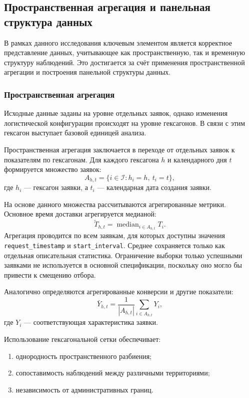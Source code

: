 \documentclass[14pt,a4paper]{extarticle}
\begin{document}
\subsection{Пространственная агрегация и панельная структура данных}

В рамках данного исследования ключевым элементом является корректное представление данных, учитывающее как пространственную, так и временную структуру наблюдений. Это достигается за счёт применения пространственной агрегации и построения панельной структуры данных.

\subsubsection{Пространственная агрегация}

Исходные данные заданы на уровне отдельных заявок, однако изменения логистической конфигурации происходят на уровне гексагонов. В связи с этим гексагон выступает базовой единицей анализа.

Пространственная агрегация заключается в переходе от отдельных заявок к показателям по гексагонам. Для каждого гексагона \(h\) и календарного дня \(t\) формируется множество заявок:
\[
A_{h,t} = \{ i \in \mathcal{I} : h_i = h,\ t_i = t \},
\]
где \(h_i\) --- гексагон заявки, а \(t_i\) --- календарная дата создания заявки.

На основе данного множества рассчитываются агрегированные метрики. Основное время доставки агрегируется медианой:
\[
\widetilde{T}_{h,t} =
\operatorname{median}_{i\in A_{h,t}} T_i.
\]
Агрегация проводится по всем заявкам, для которых доступны значения \texttt{request\_timestamp} и \texttt{start\_interval}. Среднее сохраняется только как отдельная описательная статистика. Ограничение выборки только успешными заявками не используется в основной спецификации, поскольку оно могло бы привести к смещению отбора.

Аналогично определяются агрегированные конверсии и другие показатели:
\[
\bar{Y}_{h,t} =
\frac{1}{|A_{h,t}|}
\sum_{i \in A_{h,t}} Y_i,
\]
где \(Y_i\) --- соответствующая характеристика заявки.

Использование гексагональной сетки обеспечивает:
\begin{enumerate}
    \item однородность пространственного разбиения;
    \item сопоставимость наблюдений между различными территориями;
    \item независимость от административных границ.
\end{enumerate}
\end{document}
